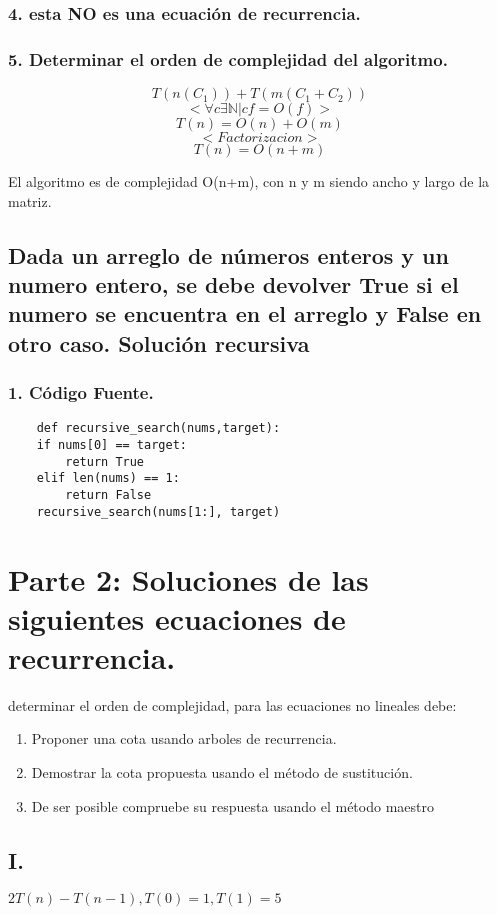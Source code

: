 \documentclass[12pt]{exam}
\begin{document}
\subsubsection*{4. esta NO es una ecuación de recurrencia.}
\subsubsection*{5. Determinar el orden de complejidad del algoritmo.}

$$ T(n(C_1)) + T(m(C_1+C_2)) $$
$$< \forall c \exists \mathbb{N} | cf = O(f) >$$
$$ T(n) = O(n) + O(m) $$
$$ < Factorizacion > $$ 
$$ T(n) = O(n+m) $$

El algoritmo es de complejidad O(n+m), con n y m siendo ancho y largo de la
matriz.

\subsection*{Dada un arreglo de números enteros y un numero entero, se debe devolver
True si el numero se encuentra en el arreglo y False en otro caso. Solución recursiva}
\subsubsection*{1. Código Fuente.}
\begin{verbatim}
    def recursive_search(nums,target):
    if nums[0] == target:
        return True
    elif len(nums) == 1:
        return False
    recursive_search(nums[1:], target)
\end{verbatim}

\section*{Parte 2: Soluciones de las siguientes ecuaciones de recurrencia.}
determinar el orden de complejidad, para las ecuaciones no lineales debe:
\begin{enumerate}
    \item Proponer una cota usando arboles de recurrencia.
    \item Demostrar la cota propuesta usando el método de sustitución.
    \item De ser posible compruebe su respuesta usando el método maestro
\end{enumerate}
\subsection*{I.}
$ 2T(n) - T(n-1), T(0)=1, T(1)=5 $
\end{document}
